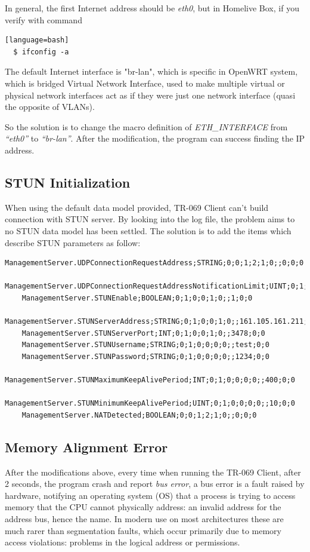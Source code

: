 In general, the first Internet address should be \textit{eth0}, but in Homelive Box, if you verify with command
\begin{lstlisting}[style=DOS][language=bash]
  $ ifconfig -a
\end{lstlisting}

The default Internet interface is "br-lan", which is specific in OpenWRT system, which is bridged Virtual Network Interface, used to make multiple virtual or physical network interfaces act as if they were just one network interface (quasi the opposite of VLANs).

So the solution is to change the macro definition of \textit{ETH\_INTERFACE} from \textit{``eth0''} to \textit{``br-lan''}. After the modification, the program can success finding the IP address.
\subsection{STUN Initialization}

When using the default data model provided, TR-069 Client can't build connection with STUN server. By looking into the log file, the problem aims to no STUN data model has been settled. The solution is to add the items which describe STUN parameters as follow:
\begin{lstlisting}[mathescape]
    ManagementServer.UDPConnectionRequestAddress;STRING;0;0;1;2;1;0;;0;0;0
    ManagementServer.UDPConnectionRequestAddressNotificationLimit;UINT;0;1;0;0;0;0;;0;0;0
    ManagementServer.STUNEnable;BOOLEAN;0;1;0;0;1;0;;1;0;0
    ManagementServer.STUNServerAddress;STRING;0;1;0;0;1;0;;161.105.161.211;0;0
    ManagementServer.STUNServerPort;INT;0;1;0;0;1;0;;3478;0;0
    ManagementServer.STUNUsername;STRING;0;1;0;0;0;0;;test;0;0
    ManagementServer.STUNPassword;STRING;0;1;0;0;0;0;;1234;0;0
    ManagementServer.STUNMaximumKeepAlivePeriod;INT;0;1;0;0;0;0;;400;0;0
    ManagementServer.STUNMinimumKeepAlivePeriod;UINT;0;1;0;0;0;0;;10;0;0
    ManagementServer.NATDetected;BOOLEAN;0;0;1;2;1;0;;0;0;0
\end{lstlisting}
\subsection{Memory Alignment Error}
After the modifications above, every time when running the TR-069 Client, after 2 seconds, the program crash and report \textit{bus error}, a bus error is a fault raised by hardware, notifying an operating system (OS) that a process is trying to access memory that the CPU cannot physically address: an invalid address for the address bus, hence the name. In modern use on most architectures these are much rarer than segmentation faults, which occur primarily due to memory access violations: problems in the logical address or permissions.


